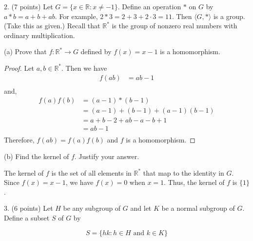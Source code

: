 \documentclass[12pt]{article}
\newenvironment{problem}[2][Problem]{\begin{trivlist}
\item[\hskip \labelsep {\bfseries #1}\hskip \labelsep {\bfseries #2.}]}{\end{trivlist}}
\begin{document}
\pagebreak

2. (7 points) Let $G=\{x \in \mathbb{R}: x \neq-1\}$. Define an operation $*$ on $G$ by $a * b=a+b+a b$. For example, $2 * 3=2+3+2 \cdot 3=11$. Then $\langle G, *\rangle$ is a group. (Take this as given.) Recall that $\mathbb{R}^{*}$ is the group of nonzero real numbers with ordinary multiplication.

\begin{problem}{2a}
(a) Prove that $f: \mathbb{R}^{*} \rightarrow G$ defined by $f(x)=x-1$ is a homomorphism.
\end{problem}

\begin{proof}
	Let $a,b \in \mathbb{R}^*$. Then we have
	$$
	\begin{aligned}
		f(ab) &= ab - 1 \\
	\end{aligned} 
	$$
	and, 
	$$
	\begin{aligned}
		f(a)f(b) &= (a-1)*(b-1) \\
		&= (a-1) + (b-1) + (a-1)(b-1) \\
		&= a + b - 2 + ab - a - b + 1 \\
		&= ab - 1 \\
	\end{aligned} 
	$$
	Therefore, $f(ab) = f(a)f(b)$ and $f$ is a homomorphism.
\end{proof}

\begin{problem}{2b}
(b) Find the kernel of $f$. Justify your answer.
\end{problem}

The kernel of $f$ is the set of all elements in $\mathbb{R}^*$ that map to the identity in $G$. Since $f(x) = x - 1$, we have $f(x) = 0$ when $x = 1$. Thus, the kernel of $f$ is $\{1\}$.

\pagebreak

3. (6 points) Let $H$ be any subgroup of $G$ and let $K$ be a normal subgroup of $G$. Define a subset $S$ of $G$ by


$$
S=\{h k: h \in H \text { and } k \in K\}
$$
\end{document}
